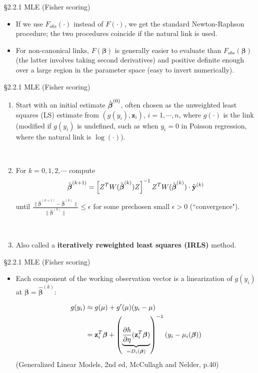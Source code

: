 \documentclass{beamer}
\newcommand{\boldbeta}{{\boldsymbol \beta}}
\newenvironment{wideitemize}%
  {\begin{itemize}%
    \setlength{\parskip}{1em}}%
  {\end{itemize}}
\begin{document}
\begin{frame}{\S2.2.1 MLE (Fisher scoring)}

\begin{wideitemize}
\item If  we use $F_{obs} (\cdot)$ instead of $F (\cdot)$, we get the standard Newton-Raphson procedure; the two procedures coincide if the natural link  is used.

\item For non-canonical links, $F(\boldbeta)$ is generally easier to evaluate than $F_{obs} (\boldbeta)$ (the latter involves taking second derivatives) and  positive definite enough over a large region in the parameter space (easy to invert numerically).
\end{wideitemize}


\end{frame}
\begin{frame}{\S2.2.1 MLE (Fisher scoring) }
\begin{enumerate}
\item
Start with an initial estimate $\hat{\mbox{\boldmath $\beta$}}^{(0)}$, often chosen as the unweighted
least squares (LS) estimate from $(g(y_i),\textbf{z}_i)$, $i=1,\cdots,n$, where $g(\cdot)$ is the link (modified if $g(y_i)$ is undefined, such as when $y_i = 0$ in Poisson regression, where the natural link is $\log(\cdot)$).

\ \
\item
For $k=0,1,2,\cdots$ compute 
$$\hat{\mbox{\boldmath $\beta$}}^{(k+1)}=\left[Z^TW(\hat{\mbox{\boldmath $\beta$}}^{(k)})Z\right]^{-1}
Z^TW(\hat{\mbox{\boldmath $\beta$}}^{(k)})\cdot \tilde{\textbf{y}}^{(k)}$$
until $\frac{\|\hat{\boldsymbol \beta}^{(k+1 )} - \hat{\boldsymbol \beta}^{(k)}\|}{\|\hat{\boldsymbol \beta}^{(k)}\|} \leq \epsilon $ for some prechosen small $\epsilon > 0$ (``convergence").

\ \

\item Also called a  \textbf{iteratively reweighted least squares (IRLS)} method. 
\end{enumerate}

\end{frame}


\begin{frame}{\S2.2.1 MLE (Fisher scoring) }

\begin{itemize}

\item 
Each component of the working observation vector is a linearization of $g(y_i)$ at $\boldbeta = \hat{\boldbeta}^{(k)}$:

\begin{align*}
g(y_i) &\approx g(\mu) +g'(\mu) (y_i - \mu) \\
&= {\bf z}_i^T{\boldsymbol \beta} +  \left( \underbrace{\frac{\partial h}{ \partial \eta} ({\bf z}_i^T{\boldsymbol \beta} )}_{= D_i ({\boldsymbol \beta})}\right)^{-1}  (y_i - \mu_i ({\boldsymbol \beta}))
\end{align*}
(Generalized Linear Models, 2nd ed, McCullagh and Nelder, p.40)


\end{itemize}
\end{frame}
\end{document}
